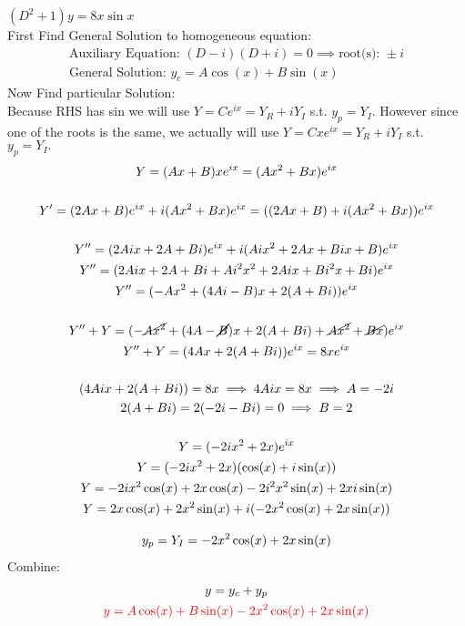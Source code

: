 \item [26.] $(D^2+1)y=8x\sin x$\\[2mm]
First Find General Solution to homogeneous equation:
\begin{gather*}
    \text{Auxiliary Equation: } (D-i)(D+i)=0
    \implies \text{root(s): } \pm i\\
    \text{General Solution: } y_c=A\cos (x)+B\sin (x) 
\end{gather*}
Now Find particular Solution:\\
Because RHS has sin we will use $Y = Ce^{ix} = Y_R + iY_I $ s.t. $y_p = Y_I$. However since one of the roots is the same, we actually will use $Y = Cxe^{ix} = Y_R + iY_I$ s.t. $y_p = Y_I.$
\begin{gather*}
    Y = (Ax+B)xe^{ix}=(Ax^2+Bx)e^{ix}\\[5mm]
    Y' = (2Ax+B)e^{ix}+i(Ax^2+Bx)e^{ix} = ((2Ax+B)+i(Ax^2+Bx))e^{ix}\\[5mm]
    Y'' = (2Aix+2A+Bi)e^{ix}+i(Aix^2+2Ax+Bix+B)e^{ix}\\
    Y'' = (2Aix+2A+Bi+Ai^2x^2+2Aix+Bi^2x+Bi)e^{ix}\\
    Y'' = (-Ax^2+(4Ai-B)x+2(A+Bi))e^{ix}\\[5mm]
    Y''+Y=(-\cancel{Ax^2}+(4A-\cancel{B})x+2(A+Bi)+\cancel{Ax^2}+\cancel{Bx})e^{ix}\\
    Y''+Y=(4Ax+2(A+Bi))e^{ix}=8xe^{ix}\\[5mm]
    (4Aix+2(A+Bi))=8x \implies 4Aix = 8x \implies A = -2i\\
    2(A+Bi) = 2(-2i-Bi) = 0 \implies B = 2\\[5mm]
    Y = (-2ix^2+2x)e^{ix}\\
    Y = (-2ix^2+2x)(\cos(x)+i\sin(x))\\
    Y = -2ix^2\cos(x)+2x\cos(x)-2i^2x^2\sin(x)+2xi\sin(x)\\
    Y = 2x\cos(x)+2x^2\sin(x)+i(-2x^2\cos(x)+2x\sin(x))\\[3mm]
    y_p = Y_I = -2x^2\cos(x)+2x\sin(x)
\end{gather*}
Combine:
\begin{gather*}
    y=y_c+y_p\\
    \textcolor{red}{y = A\cos (x)+B\sin (x) -2x^2\cos(x)+2x\sin(x)}
\end{gather*}